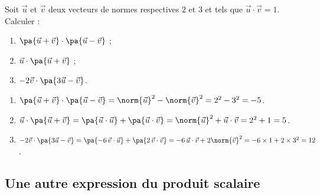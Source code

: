 \begin{methode}
	Soit $\vec{u}$ et $\vec{v}$ deux vecteurs de normes respectives $2$ et $3$ et tels que $\vec{u}\cdot\vec{v} = 1$. Calculer :

	\begin{enumerate}
		\item $\pa{\vec{u} + \vec{v}}\cdot\pa{\vec{u} - \vec{v}}$ ;
		\item $\vec{u}\cdot\pa{\vec{u} + \vec{v}}$ ;
		\item $-2\vec{v}\cdot\pa{3\vec{u} - \vec{v}}$.
	\end{enumerate}

	\begin{correction}
		\nline
		\begin{enumerate}
			\item $\pa{\vec{u} + \vec{v}}\cdot\pa{\vec{u} - \vec{v}} = \norm{\vec{u}}^2 - \norm{\vec{v}}^2 = 2^2 - 3^2 = -5$.
			\item $\vec{u}\cdot\pa{\vec{u} + \vec{v}} = \pa{\vec{u}\cdot\vec{u}} + \pa{\vec{u}\cdot\vec{v}} = \norm{\vec{u}}^2 + \vec{u}\cdot\vec{v} = 2^2 + 1 = 5$.
			\item $-2\vec{v}\cdot\pa{3\vec{u} - \vec{v}} = \pa{-6\,\vec{v}\cdot\vec{u}} + \pa{2\,\vec{v}\cdot\vec{v}} = -6\,\vec{u}\cdot\vec{v} + 2\norm{\vec{v}}^2 = -6 \times 1 + 2 \times 3^2 = 12$.
		\end{enumerate}
	\end{correction}
\end{methode}

\subsection{Une autre expression du produit scalaire}

